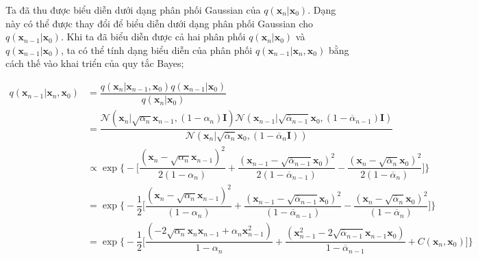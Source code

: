 \documentclass[14pt, a4paper]{article}
\numberwithin{equation}{section}
\numberwithin{figure}{section}
\numberwithin{dl}{section}
\numberwithin{md}{section}
\numberwithin{bd}{section}
\numberwithin{dn}{section}
\numberwithin{hq}{section}
\begin{document}
    Ta đã thu được biểu diễn dưới dạng phân phối Gaussian của $q(\boldsymbol{x}_n \vert \boldsymbol{x}_0)$.
    Dạng này có thể được thay đổi để biểu diễn dưới dạng phân phối Gaussian cho $q(\boldsymbol{x}_{n-1} \vert \boldsymbol{x}_0)$.
    Khi ta đã biểu diễn được cả hai phân phối $q(\boldsymbol{x}_n \vert \boldsymbol{x}_0)$ và $q(\boldsymbol{x}_{n-1} \vert \boldsymbol{x}_0)$, ta có thể tính dạng biểu diễn của phân phối $q(\boldsymbol{x}_{n-1} \vert \boldsymbol{x}_n, \boldsymbol{x}_0)$ bằng cách thế vào khai triển của quy tắc Bayes;

    \begin{equation*}
        \begin{aligned}
            q(\boldsymbol{x}_{n-1} \vert \boldsymbol{x}_n, \boldsymbol{x}_0) &= \dfrac{q(\boldsymbol{x}_n \vert \boldsymbol{x}_{n-1}, \boldsymbol{x}_0) q(\boldsymbol{x}_{n-1} \vert \boldsymbol{x}_0)}{q(\boldsymbol{x}_n \vert \boldsymbol{x}_0)} \\
            &= \dfrac{\mathcal{N}(\boldsymbol{x}_n \vert \sqrt{\alpha_n} \boldsymbol{x}_{n-1}, (1 - \alpha_n) \boldsymbol{I}) \mathcal{N} (\boldsymbol{x}_{n-1} \vert \sqrt{\overline{\alpha}_{n-1}} \boldsymbol{x}_0, (1 - \overline{\alpha}_{n-1}) \boldsymbol{I})}{\mathcal{N} (\boldsymbol{x}_n \vert \sqrt{\overline{\alpha}_n} \boldsymbol{x}_0, (1 - \overline{\alpha}_n \boldsymbol{I}))} \\
            & \propto \exp \Bigg \lbrace - \Bigg \lbrack \dfrac{(\boldsymbol{x}_n - \sqrt{\alpha_n} \boldsymbol{x}_{n-1})^2}{2(1 - \alpha_n)} + \dfrac{(\boldsymbol{x}_{n-1} - \sqrt{\overline{\alpha}_{n-1}} \boldsymbol{x}_0)^2}{2(1 - \overline{\alpha}_{n-1})} - \dfrac{(\boldsymbol{x}_n - \sqrt{\overline{\alpha}_n} \boldsymbol{x}_0)^2}{2(1 - \overline{\alpha}_n)}  \Bigg \rbrack \Bigg \rbrace \\
            &= \exp \Bigg \lbrace - \dfrac{1}{2} \Bigg \lbrack \dfrac{(\boldsymbol{x}_n - \sqrt{\alpha_n} \boldsymbol{x}_{n-1})^2}{(1 - \alpha_n)} + \dfrac{(\boldsymbol{x}_{n-1} - \sqrt{\overline{\alpha}_{n-1}} \boldsymbol{x}_0)^2}{(1 - \overline{\alpha}_{n-1})} - \dfrac{(\boldsymbol{x}_n - \sqrt{\overline{\alpha}_n} \boldsymbol{x}_0)^2}{(1 - \overline{\alpha}_n)}  \Bigg \rbrack \Bigg \rbrace \\
            &= \exp \Bigg \lbrace - \dfrac{1}{2} \Bigg \lbrack \dfrac{(-2 \sqrt{\alpha_n} \boldsymbol{x}_n \boldsymbol{x}_{n-1} + \alpha_n \boldsymbol{x}_{n-1}^2)}{1 - \alpha_n} + \dfrac{(\boldsymbol{x}_{n-1}^2 - 2 \sqrt{\overline{\alpha}_{n-1}} \boldsymbol{x}_{n-1} \boldsymbol{x}_0)}{1 - \overline{\alpha}_{n-1}} + C(\boldsymbol{x}_n, \boldsymbol{x}_0) \Bigg \rbrack \Bigg \rbrace \\

\end{aligned}
\end{equation*}
\end{document}
